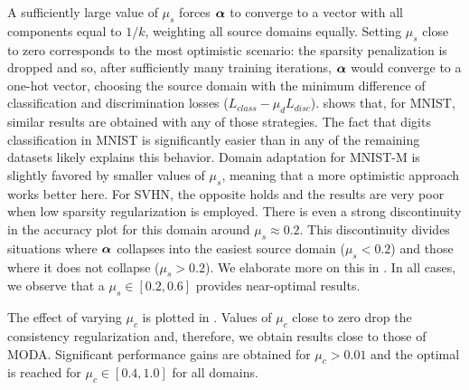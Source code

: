 A sufficiently large value of $\mu_s$ forces ${\bm{\alpha}}$ to converge to a vector with all components equal to $1/k$, weighting all source domains equally. Setting $\mu_s$ close to zero corresponds to the most optimistic scenario: the sparsity penalization is dropped and so, after sufficiently many training iterations, ${\bm{\alpha}}$ would converge to a one-hot vector, choosing the source domain with the minimum difference of classification and discrimination losses ($L_{class} - \mu_d L_{disc}$).  shows that, for MNIST, similar results are obtained with any of those strategies. The fact that digits classification in MNIST is significantly easier than in any of the remaining datasets likely explains this behavior. Domain adaptation for MNIST-M is slightly favored by smaller values of $\mu_s$, meaning that a more optimistic approach works better here. For SVHN, the opposite holds and the results are very poor when low sparsity regularization is employed. There is even a strong discontinuity in the accuracy plot for this domain around $\mu_s \approx 0.2$. This discontinuity divides situations where ${\bm{\alpha}}$ collapses into the easiest source domain ($\mu_s < 0.2$) and those where it does not collapse ($\mu_s > 0.2$). We elaborate more on this in . In all cases, we observe that a $\mu_s \in [0.2, 0.6]$ provides near-optimal results.

The effect of varying $\mu_c$ is plotted in . Values of $\mu_c$ close to zero drop the consistency regularization and, therefore, we obtain results close to those of MODA. Significant performance gains are obtained for $\mu_c > 0.01$ and the optimal is reached for $\mu_c \in [0.4, 1.0]$ for all domains.

